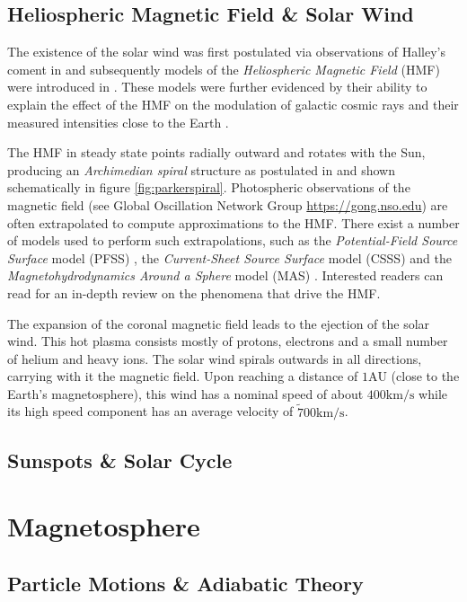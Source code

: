 \subsection{Heliospheric Magnetic Field \& Solar Wind}

The existence of the solar wind was first postulated via observations of Halley's coment in 
\citet{Bierman1,Bierman2,Bierman3} and subsequently models of the \emph{Heliospheric Magnetic Field} (HMF) 
were introduced in \citet{parker1958dynamics}. These models were further evidenced by their ability 
to explain the effect of the HMF on the modulation of galactic cosmic rays and their measured intensities 
close to the Earth \citep{ParkerSolarWind}. 

The HMF in steady state points radially outward and rotates with the Sun, producing an \emph{Archimedian spiral} 
structure as postulated in \cite{parker1958dynamics} and shown schematically in figure \ref{fig:parkerspiral}. 
Photospheric observations of the magnetic field (see Global Oscillation Network Group \url{https://gong.nso.edu}) 
are often extrapolated to compute approximations to the HMF. There exist a number of models used to perform such 
extrapolations, such as the \emph{Potential-Field Source Surface} model (PFSS) 
\citep{schatten1969model,altschuler1969magnetic}, the \emph{Current-Sheet Source Surface} model (CSSS) 
\citep{csss} and the \emph{Magnetohydrodynamics Around a Sphere} model (MAS) 
\citep{linker1999magnetohydrodynamic}. Interested readers can read \citep{Owens2013} for an in-depth review on 
the phenomena that drive the HMF.

The expansion of the coronal magnetic field leads to the ejection of the solar wind. This hot plasma consists 
mostly of protons, electrons and a small number of helium and heavy ions. The solar wind spirals outwards in all 
directions, carrying with it the magnetic field. Upon reaching a distance of $1 \text{AU}$ 
(close to the Earth's magnetosphere), this wind has a nominal speed of about $400 \text{km}/\text{s}$ while its 
high speed component has an average velocity of $\tilde 700 \text{km}/\text{s}$.



\subsection{Sunspots \& Solar Cycle}\label{sec:sunspots}



\section{Magnetosphere}\label{sec:mag}

\subsection{Particle Motions \& Adiabatic Theory} \label{sec:plasmadiff}

\clearpage



